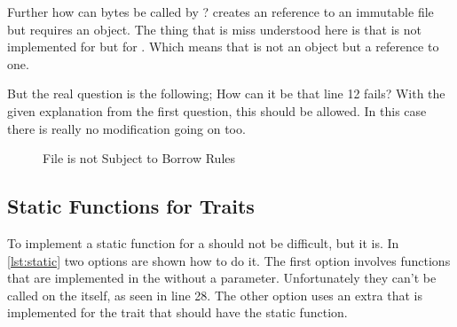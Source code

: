 \documentclass[thesis]{subfiles}
\begin{document}
    Further how can bytes be called by ?
     creates an reference to an immutable file but  requires an object.
    The thing that is miss understood here is that \trait \Read is not implemented for \File but for .
    Which means that \self is not an object but a reference to one.

    But the real question is the following; How can it be that line 12 fails?
    With the given explanation from the first question, this should be allowed.
    In this case there is really no modification going on too.

    \begin{figure}[ht]
      \captionsetup{type=lstlisting}
      
      \caption{File is not Subject to Borrow Rules}\label{lst:rustfile}
    \end{figure}

  \subsection{Static Functions for Traits}
    To implement a static function for a \trait should not be difficult, but it is.
    In \autoref{lst:static} two options are shown how to do it.
    The first option involves functions that are implemented in the \trait without a \self parameter.
    Unfortunately they can't be called on the \trait itself, as seen in line 28.
    The other option uses an extra \trait that is implemented for the trait that should have the static function.

    \newsavebox{\staticOne}
    \begin{lrbox}{\staticOne}
      \begin{minipage}{.47\linewidth}
        
      \end{minipage}
    \end{lrbox}

    \newsavebox{\staticTwo}
    \begin{lrbox}{\staticTwo}
      \begin{minipage}{.45\linewidth}
        
      \end{minipage}
    \end{lrbox}
\end{document}
